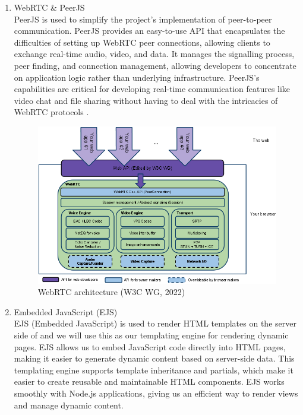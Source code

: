 \documentclass[a4paper,12pt]{article}  %
\begin{document}
\begin{enumerate}
      \item WebRTC \& PeerJS\\ PeerJS is used to simplify the project's implementation of
            peer-to-peer communication. PeerJS provides an easy-to-use API that
            encapsulates the difficulties of setting up WebRTC peer connections, allowing
            clients to exchange real-time audio, video, and data. It manages the signalling
            process, peer finding, and connection management, allowing developers to
            concentrate on application logic rather than underlying infrastructure.
            PeerJS's capabilities are critical for developing real-time communication
            features like video chat and file sharing without having to deal with the
            intricacies of WebRTC protocols \cite{webrtc2024} \cite{peerjs2024}.\\
            \begin{figure}[H]
                  \centering
                  \includegraphics[width=1\textwidth]{figures/w3rtc.png}
                  \caption{WebRTC architecture  (W3C WG, 2022)}
            \end{figure}

      \item Embedded JavaScript (EJS)\\ EJS (Embedded JavaScript) is used to render HTML
            templates on the server side of and we will use this as our templating engine
            for rendering dynamic pages. EJS allows us to embed JavaScript code directly
            into HTML pages, making it easier to generate dynamic content based on
            server-side data. This templating engine supports template inheritance and
            partials, which make it easier to create reusable and maintainable HTML
            components. EJS works smoothly with Node.js applications, giving us an
            efficient way to render views and manage dynamic
            content\cite{geeksforgeeks2024ejs}.\\


\end{enumerate}
\end{document}
